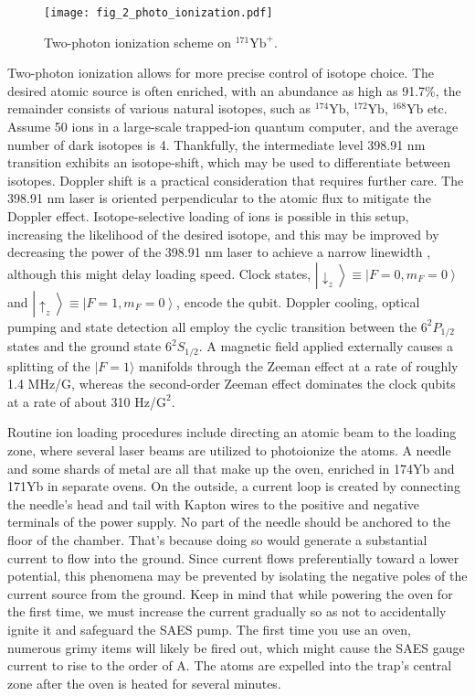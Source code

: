 \begin{figure}
    \centering
    \texttt{[image: fig\_2\_photo\_ionization.pdf]}
    \caption{Two-photon ionization scheme on ${ }^{171} \mathrm{Yb}^{+}$.}
    \label{fig:photo_ionization}
\end{figure}

Two-photon ionization allows for more precise control of isotope choice. The desired atomic source is often enriched, with an abundance as high as 91.7\%, the remainder consists of various natural isotopes, such as ${ }^{174} \mathrm{Yb}$, ${ }^{172} \mathrm{Yb}$, ${ }^{168} \mathrm{Yb}$ etc. Assume 50 ions in a large-scale trapped-ion quantum computer, and the average number of dark isotopes is 4. Thankfully, the intermediate level 398.91 nm transition exhibits an isotope-shift, which may be used to differentiate between isotopes. Doppler shift is a practical consideration that requires further care. The 398.91 nm laser is oriented perpendicular to the atomic flux to mitigate the Doppler effect. Isotope-selective loading of ions is possible in this setup, increasing the likelihood of the desired isotope, and this may be improved by decreasing the power of the 398.91 nm laser to achieve a narrow linewidth , although this might delay loading speed. Clock states, $\left|\downarrow_z\right\rangle \equiv\left|F=0, m_F=0\right\rangle$ and $\left|\uparrow_z\right\rangle \equiv\left|F=1, m_F=0\right\rangle$, encode the qubit. Doppler cooling, optical pumping and state detection all employ the cyclic transition between the $6^2 P_{1 / 2}$ states and the ground state $6^2 S_{1 / 2}$. A magnetic field applied externally causes a splitting of the $|F=1\rangle$ manifolds through the Zeeman effect at a rate of roughly 1.4 MHz/G, whereas the second-order Zeeman effect dominates the clock qubits at a rate of about 310 Hz/$\mathrm{G}^2$.

Routine ion loading procedures include directing an atomic beam to the loading zone, where several laser beams are utilized to photoionize the atoms. A needle and some shards of metal are all that make up the oven, enriched in 174Yb and 171Yb in separate ovens. On the outside, a current loop is created by connecting the needle's head and tail with Kapton wires to the positive and negative terminals of the power supply. No part of the needle should be anchored to the floor of the chamber. That's because doing so would generate a substantial current to flow into the ground. Since current flows preferentially toward a lower potential, this phenomena may be prevented by isolating the negative poles of the current source from the ground. Keep in mind that while powering the oven for the first time, we must increase the current gradually so as not to accidentally ignite it and safeguard the SAES pump. The first time you use an oven, numerous grimy items will likely be fired out, which might cause the SAES gauge current to rise to the order of A. The atoms are expelled into the trap's central zone after the oven is heated for several minutes.

